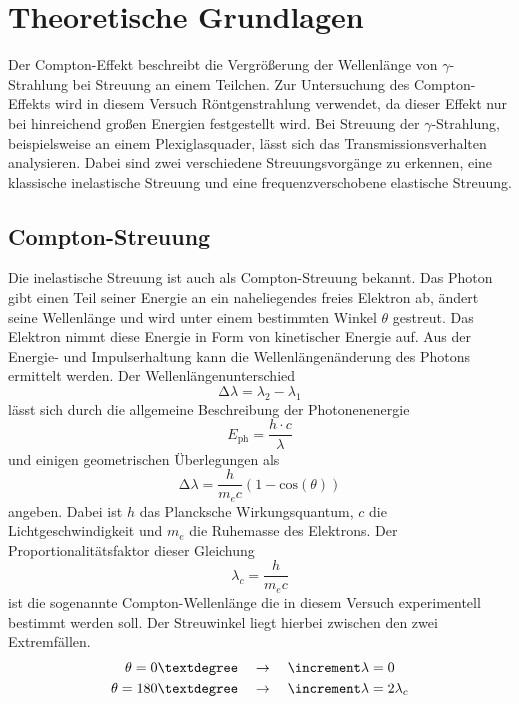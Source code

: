 \section{Theoretische Grundlagen}
Der Compton-Effekt beschreibt die Vergrößerung der Wellenlänge von $\gamma$-Strahlung bei Streuung an einem Teilchen. Zur Untersuchung
des Compton-Effekts wird in diesem Versuch Röntgenstrahlung verwendet, da dieser Effekt nur bei hinreichend großen Energien festgestellt wird.
Bei Streuung der $\gamma$-Strahlung, beispielsweise an einem Plexiglasquader, lässt sich das Transmissionsverhalten analysieren. Dabei
sind zwei verschiedene Streuungsvorgänge zu erkennen, eine klassische inelastische Streuung und eine frequenzverschobene elastische Streuung.
\\
\subsection{Compton-Streuung}
Die inelastische Streuung ist auch als Compton-Streuung bekannt. Das Photon gibt einen Teil seiner Energie an ein naheliegendes freies Elektron ab, ändert seine Wellenlänge und wird unter einem 
bestimmten Winkel $\theta$ gestreut. Das Elektron nimmt diese Energie in Form von kinetischer Energie auf. Aus der Energie- und Impulserhaltung kann die Wellenlängenänderung des Photons ermittelt werden.
Der Wellenlängenunterschied
\begin{equation}
\label{eqn:diff}
\increment \lambda = \lambda_{2} - \lambda_{1}
\end{equation}
lässt sich durch die allgemeine Beschreibung der Photonenenergie
\begin{equation}
\label{eqn:photoneneq}
E_{\text{ph}} = \frac{h \cdot c}{\lambda}
\end{equation}
und einigen geometrischen Überlegungen als
\begin{equation}
\increment \lambda = \frac{h}{m_{e} c}(1-\text{cos}(\theta))
\end{equation}
angeben. Dabei ist $h$ das Plancksche Wirkungsquantum, $c$ die Lichtgeschwindigkeit und $m_{e}$ die Ruhemasse des Elektrons.
Der Proportionalitätsfaktor dieser Gleichung
\begin{equation}
\label{eqn:comptonwavelength}
\lambda_{c} = \frac{h}{m_{e} c}
\end{equation}
ist die sogenannte Compton-Wellenlänge die in diesem Versuch experimentell bestimmt werden soll. Der Streuwinkel liegt hierbei zwischen den
zwei Extremfällen. 
\begin{align*}
\theta = 0\textdegree \quad &\to \quad \increment \lambda = 0 \\
\theta = 180\textdegree \quad &\to \quad \increment \lambda = 2 \lambda_{c}
\end{align*}
